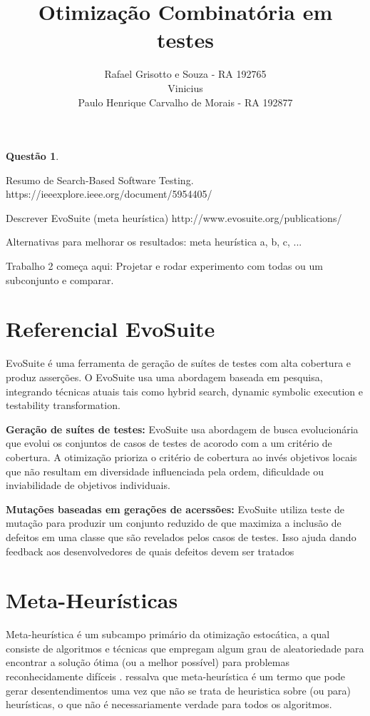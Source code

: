 \documentclass[12pt,a4paper]{article}
\title{Otimização Combinatória em  \\ testes}
\author{Rafael Grisotto e Souza - RA 192765\\ Vinicius \\ Paulo Henrique Carvalho de Morais - RA 192877}
\newtheorem{questao}{Questão}
\begin{document}
\maketitle


\begin{questao}
\end{questao}

Resumo de Search-Based Software Testing.
https://ieeexplore.ieee.org/document/5954405/

Descrever EvoSuite (meta heurística)
http://www.evosuite.org/publications/

Alternativas para melhorar os resultados: meta heurística a, b, c, ...


Trabalho 2 começa aqui:
\cite{arcuri2017restful}
Projetar e rodar experimento com todas ou um subconjunto e comparar.





\newpage

\section{Referencial EvoSuite}
EvoSuite é uma ferramenta de geração de suítes de testes com alta cobertura e produz asserções. O EvoSuite usa uma abordagem baseada em pesquisa, integrando técnicas atuais tais como hybrid search, dynamic symbolic execution e testability transformation.

\textbf{Geração de suítes de testes:} EvoSuite usa abordagem de busca evolucionária que evolui os conjuntos de casos de testes de acorodo com a um critério de cobertura. A otimização prioriza o critério de cobertura ao invés objetivos locais que não resultam em diversidade influenciada pela ordem, dificuldade ou inviabilidade de objetivos individuais.

\textbf{Mutações baseadas em gerações de acerssões:} EvoSuite utiliza teste de mutação para produzir um conjunto reduzido de que maximiza a inclusão de defeitos em uma classe que são revelados pelos casos de testes. Isso ajuda dando feedback aos desenvolvedores de quais defeitos devem ser tratados 

\section{Meta-Heurísticas}
Meta-heurística é um subcampo primário da otimização estocática, a qual consiste de algoritmos e técnicas que empregam algum grau de aleatoriedade para encontrar a solução ótima (ou a melhor possível) para problemas reconhecidamente difíceis \cite{luke2009essentials}. \citeauthor{luke2009essentials} ressalva que meta-heurística é um termo que pode gerar desentendimentos uma vez que não se trata de heuristica sobre (ou para) heurísticas, o que não é necessariamente verdade para todos os algoritmos. 
\end{document}
